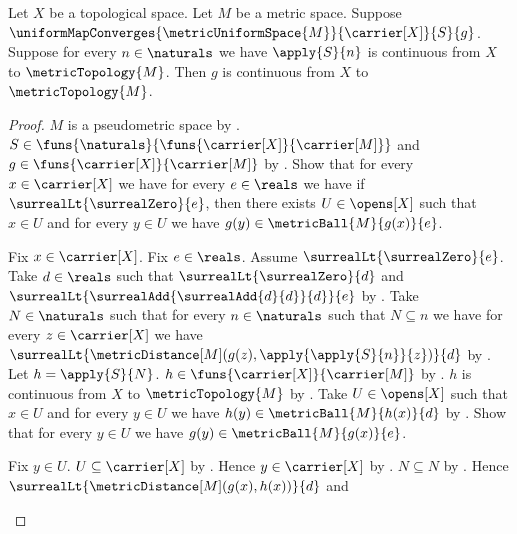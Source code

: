 \begin{theorem}\label{uniform_limit_of_continuous_maps}
    Let $X$ be a topological space.
    Let $M$ be a metric space.
    Suppose $\uniformMapConverges
        {\metricUniformSpace{M}}{\carrier[X]}{S}{g}$.
    Suppose for every $n\in\naturals$ we have
        $\apply{S}{n}$ is continuous from $X$ to $\metricTopology{M}$.
    Then $g$ is continuous from $X$ to $\metricTopology{M}$.
\end{theorem}
\begin{proof}
    $M$ is a pseudometric space by
        .
    $S\in\funs{\naturals}{\funs{\carrier[X]}{\carrier[M]}}$ and
        $g\in\funs{\carrier[X]}{\carrier[M]}$
        by
        .
    Show that for every $x\in\carrier[X]$ we have for every
        $e\in\reals$ we have if $\surrealLt{\surrealZero}{e}$, then
        there exists $U\in\opens[X]$ such that $x\in U$ and
        for every $y\in U$ we have
            $g(y)\in\metricBall{M}{g(x)}{e}$.
    \begin{subproof}
        Fix $x\in\carrier[X]$.
        Fix $e\in\reals$.
        Assume $\surrealLt{\surrealZero}{e}$.
        Take $d\in\reals$ such that $\surrealLt{\surrealZero}{d}$ and
            $\surrealLt{\surrealAdd{\surrealAdd{d}{d}}{d}}{e}$
            by .
        Take $N\in\naturals$ such that for every $n\in\naturals$
            such that $N\subseteq n$ we have for every
            $z\in\carrier[X]$ we have
            $\surrealLt{\metricDistance[M]
                (g(z),\apply{\apply{S}{n}}{z})}{d}$
            by .
        Let $h=\apply{S}{N}$.
        $h\in\funs{\carrier[X]}{\carrier[M]}$
            by .
        $h$ is continuous from $X$ to $\metricTopology{M}$
            by \auto.
        Take $U\in\opens[X]$ such that $x\in U$ and
            for every $y\in U$ we have
                $h(y)\in\metricBall{M}{h(x)}{d}$
            by .
        Show that for every $y\in U$ we have
            $g(y)\in\metricBall{M}{g(x)}{e}$.
        \begin{subproof}
            Fix $y\in U$.
            $U\subseteq\carrier[X]$
                by .
            Hence $y\in\carrier[X]$ by .
            $N\subseteq N$ by .
            Hence
                $\surrealLt{\metricDistance[M](g(x),h(x))}{d}$ and

\end{subproof}
\end{subproof}
\end{proof}
